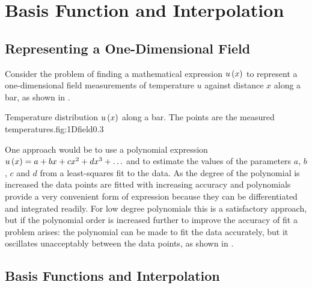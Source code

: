 \clearemptydoublepage
\chapter{Basis Function and Interpolation}
\label{cha:BasisFunctions}

\section{Representing a One-Dimensional Field}
\label{sec:reponedfield}

Consider the problem of finding a mathematical expression $ u\left( x \right) $ to
represent a one-dimensional field \eg measurements of temperature $u$
against distance $x$ along a bar, as shown in .

  {Temperature distribution $ u\left( x \right) $ along a bar.
  The points are the measured temperatures.}{fig:1Dfield}{0.3}

One approach would be to use a polynomial expression $ u\left( x \right)  = a + bx +
cx^{2} + dx^{3} + \ldots$ and to estimate the values of the parameters
$a$, $b$, $c$ and $d$ from a least-squares fit to the data.  As the degree of the
polynomial is increased the data points are fitted with increasing accuracy
and polynomials provide a very convenient form of expression because they can
be differentiated and integrated readily. For low degree polynomials this is a
satisfactory approach, but if the polynomial order is increased further to
improve the accuracy of fit a problem arises: the polynomial can be made to
fit the data accurately, but it oscillates unacceptably between the data
points, as shown in .  

\section{Basis Functions and Interpolation}
\label{sec:basisfunctions}

